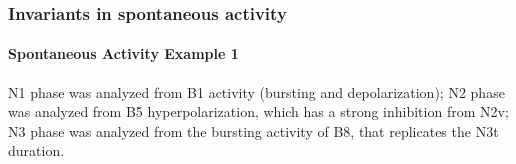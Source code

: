 


\subsubsection{Invariants in spontaneous activity}

\paragraph{Spontaneous Activity Example 1}
N1 phase was analyzed from B1 activity (bursting and depolarization); N2 phase was analyzed from B5 hyperpolarization, which has a strong inhibition from N2v; N3 phase was analyzed from the bursting activity of B8, that replicates the N3t duration. 

